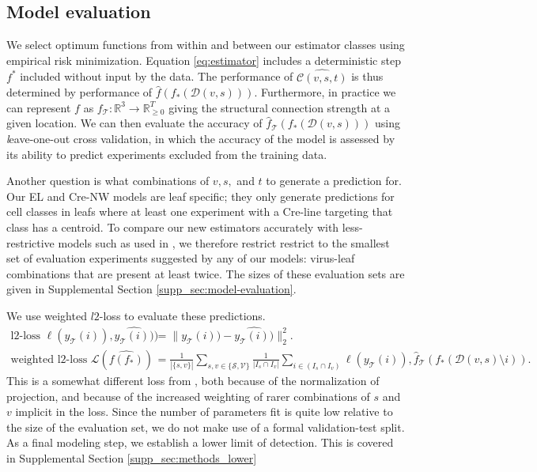 \newpage

\subsection{Model evaluation}

We select optimum functions from within and between our estimator classes using empirical risk minimization. %
Equation \ref{eq:estimator} includes a deterministic step $f^*$ included without input by the data.
The performance of $\widehat {\mathcal C (v,s,t)}$ is thus determined by performance of $\widehat f (f_*(\mathcal D(v,s)))$.
Furthermore, in practice we can represent $f$ as $f_{\mathcal T}: \mathbb R^3 \to \mathbb R_{\geq 0}^T$ giving the structural connection strength at a given location.
We can then evaluate the accuracy of $\widehat f_{\mathcal T} (f_*(\mathcal D(v,s)))$ using {\textit leave-one-out cross validation}, in which the accuracy of the model is assessed by its ability to predict experiments excluded from the training data.

Another question is what combinations of $v, s, $ and $t$ to generate a prediction for.
Our EL and Cre-NW models are leaf specific; they only generate predictions for cell classes in leafs where at least one experiment with a Cre-line targeting that class has a centroid.
To compare our new estimators accurately with less-restrictive models such as used in \citet{Knox2019-ot}, we therefore restrict restrict to the smallest set of evaluation experiments suggested by any of our models: virus-leaf combinations that are present at least twice. 
The sizes of these evaluation sets are given in Supplemental Section \ref{supp_sec:model-evaluation}.

We use weighted $l2$-loss to evaluate these predictions.
\begin{align*}
\text{l2-loss } \ell (y_{\mathcal T}(i)),\widehat {y_{\mathcal T}(i))}) &=   \| y_{\mathcal T} (i)) - \widehat {y_{\mathcal T}(i))} \|_2^2. \\
\text{weighted l2-loss } \mathcal L ( \widehat {f(f_*)}) &= \frac{1}{|\{s,v\}|} \sum_{s,v \in \{\mathcal S,\mathcal V\}} \frac{1}{ |I_{s} \cap I_v |} \sum_{i \in (I_{s} \cap I_v ) } \ell (y_{\mathcal T}(i)), \hat f_{\mathcal T} (f_*(\mathcal D(v,s) \setminus i)) .
\end{align*}
This is a somewhat different loss from \citet{Knox2019-ot}, both because of the normalization of projection, and because of the increased weighting of rarer combinations of $s$ and $v$ implicit in the loss.
Since the number of parameters fit is quite low relative to the size of the evaluation set, we do not make use of a formal validation-test split.
As a final modeling step, we establish a lower limit of detection.
This is covered in Supplemental Section \ref{supp_sec:methods_lower}

